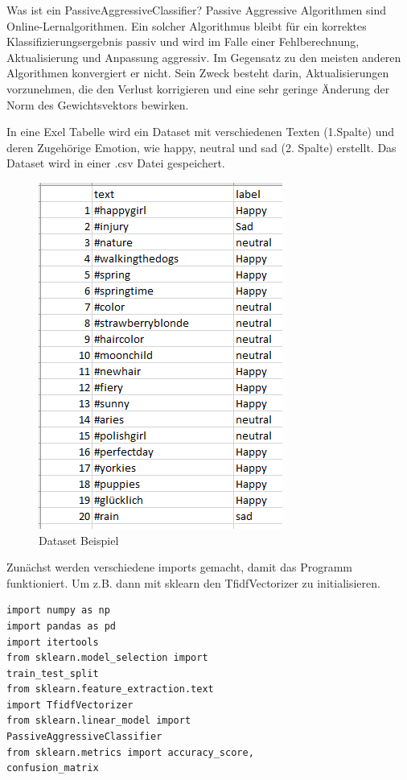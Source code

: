 \documentclass[conference]{IEEEtran}
\begin{document}
Was ist ein PassiveAggressiveClassifier?
Passive Aggressive Algorithmen sind Online-Lernalgorithmen. Ein solcher Algorithmus bleibt für ein korrektes Klassifizierungsergebnis passiv und wird im Falle einer Fehlberechnung, Aktualisierung und Anpassung aggressiv. Im Gegensatz zu den meisten anderen Algorithmen konvergiert er nicht. Sein Zweck besteht darin, Aktualisierungen vorzunehmen, die den Verlust korrigieren und eine sehr geringe Änderung der Norm des Gewichtsvektors bewirken.

\newpage
In eine Exel Tabelle wird ein Dataset mit verschiedenen Texten (1.Spalte) und deren Zugehörige Emotion, wie happy, neutral und sad (2. Spalte) erstellt. Das Dataset wird in einer .csv Datei gespeichert.
\begin{figure}[h]
	\centering
	\includegraphics{Dataset}
	\caption{Dataset Beispiel}
\end{figure}

Zunächst werden verschiedene imports gemacht, damit das Programm funktioniert. Um z.B. dann mit sklearn den TfidfVectorizer zu initialisieren.
\begin{lstlisting}
import numpy as np
import pandas as pd
import itertools
from sklearn.model_selection import 
train_test_split
from sklearn.feature_extraction.text 
import TfidfVectorizer
from sklearn.linear_model import 
PassiveAggressiveClassifier
from sklearn.metrics import accuracy_score,
confusion_matrix
\end{lstlisting}
\end{document}
